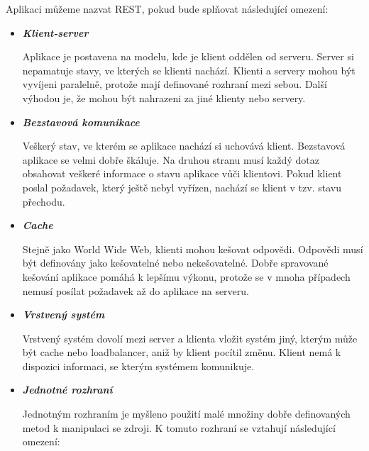 \documentclass[11pt,twoside,a4paper]{book}
\begin{document}
Aplikaci můžeme nazvat REST, pokud bude splňovat následující omezení:

\begin{itemize}
  \item \textbf{\textit{Klient-server}}

Aplikace je postavena na modelu, kde je klient oddělen od serveru. Server si nepamatuje
stavy, ve kterých se klienti nachází. Klienti a servery mohou být vyvíjeni paralelně, protože
mají definované rozhraní mezi sebou. Další výhodou je, že mohou být nahrazeni za jiné
klienty nebo servery.

\item \textbf{\textit{Bezstavová komunikace}}

Veškerý stav, ve kterém se aplikace nachází si uchovává klient. Bezstavová aplikace se velmi
dobře škáluje. Na druhou stranu musí každý dotaz obsahovat veškeré informace o stavu
aplikace vůči klientovi. Pokud klient poslal požadavek, který ještě nebyl vyřízen, nachází se
klient v tzv. stavu přechodu.

\item \textbf{\textit{Cache}}

Stejně jako World Wide Web, klienti mohou kešovat odpovědi. Odpovědi musí být
definovány jako kešovatelné nebo nekešovatelné. Dobře spravované kešování aplikace
pomáhá k lepšímu výkonu, protože se v mnoha případech nemusí posílat požadavek až do
aplikace na serveru.

\item \textbf{\textit{Vrstvený systém}}

Vrstvený systém dovolí mezi server a klienta vložit systém jiný, kterým může být cache nebo
loadbalancer, aniž by klient pocítil změnu. Klient nemá k dispozici informaci, se kterým
systémem komunikuje.

\item \textbf{\textit{Jednotné rozhraní}}

Jednotným rozhraním je myšleno použití malé množiny dobře definovaných metod k
manipulaci se zdroji. K tomuto rozhraní se vztahují následující omezení:


\end{itemize}
\end{document}
